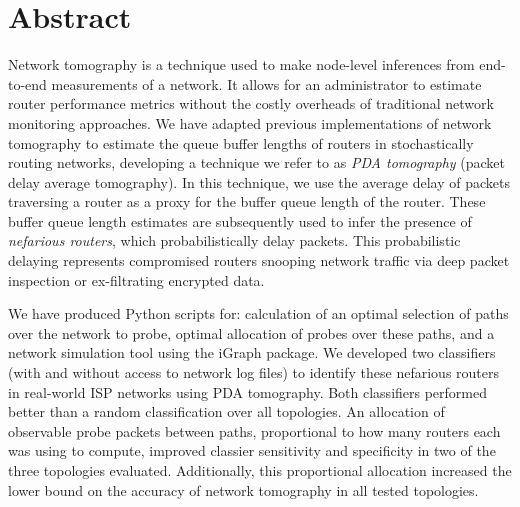 \chapter*{Abstract}
\vspace{-1em}
Network tomography is a technique used to make node-level inferences from end-to-end measurements of a network. It allows for an administrator to estimate router performance metrics without the costly overheads of traditional network monitoring approaches. We have adapted previous implementations of network tomography to estimate the queue buffer lengths of routers in stochastically routing networks, developing a technique we refer to as \textit{PDA tomography} (packet delay average tomography). In this technique, we use the average delay of packets traversing a router as a proxy for the buffer queue length of the router. These buffer queue length estimates are subsequently used to infer the presence of \textit{nefarious routers}, which probabilistically delay packets. This probabilistic delaying represents compromised routers snooping network traffic via deep packet inspection or ex-filtrating encrypted data.\par
We have produced Python scripts for: calculation of an optimal selection of paths over the network to probe, optimal allocation of probes over these paths, and a network simulation tool using the iGraph package. We developed two classifiers (with and without access to network log files) to identify these nefarious routers in real-world ISP networks using PDA tomography. Both classifiers performed better than a random classification over all topologies. An allocation of observable probe packets between paths, proportional to how many routers each was using to compute, improved classier sensitivity and specificity in two of the three topologies evaluated. Additionally, this proportional allocation increased the lower bound on the accuracy of network tomography in all tested topologies.